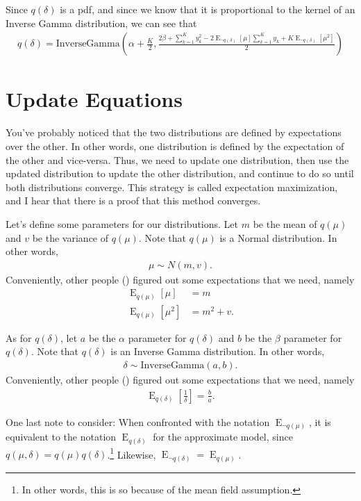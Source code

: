 \documentclass[12pt]{article}
\newcommand{\E}{\operatorname{E}}
\begin{document}
Since $q(\delta)$ is a pdf, and since we know that it is proportional to the
kernel of an Inverse Gamma distribution, we can see that
\begin{align}\label{eq:qdelta}
    q(\delta) = \text{InverseGamma}\left(\alpha + \frac{K}{2},
    \frac{2\beta + \sum_{k=1}^{K} y_{k}^{2} - 2 \E_{\neg q(\delta)}[\mu]
    \sum_{k=1}^{K} y_{k} + K\E_{\neg q(\delta)}[\mu^2]}{2}
    \right)
\end{align}

\section{Update Equations}

You've probably noticed that the two distributions are defined by expectations
over the other.  In other words, one distribution is defined by the expectation
of the other and vice-versa.  Thus, we need to update one distribution, then use
the updated distribution to update the other distribution, and continue to do so
until both distributions converge.  This strategy is called expectation
maximization, and I hear that there is a proof that this method converges.

Let's define some parameters for our distributions.  Let $m$ be the mean of
$q(\mu)$ and $v$ be the variance of $q(\mu)$.  Note that $q(\mu)$ is a Normal
distribution.  In other words,
\begin{align}
    \mu \sim N(m, v).
\end{align}
Conveniently, other people (\autocite{gaussian}) figured out some
expectations that we need, namely
\begin{align}
    \E_{q(\mu)}[\mu] &= m \\
    \E_{q(\mu)}[\mu^2] &= m^2 + v.
\end{align}

As for $q(\delta)$, let $a$ be the $\alpha$ parameter for $q(\delta)$ and $b$ be
the $\beta$ parameter for $q(\delta)$.  Note that $q(\delta)$ is an Inverse
Gamma distribution.  In other words,
\begin{align}
    \delta \sim \text{InverseGamma}(a, b).
\end{align}
Conveniently, other people (\autocite{invgamma}) figured out
some expectations that we need, namely
\begin{align}
    \E_{q(\delta)}[\frac{1}{\delta}] = \frac{b}{a}.
\end{align}

One last note to consider:  When confronted with the notation $\E_{\neg
q(\mu)}$, it is equivalent to the notation $\E_{q(\delta)}$ for the approximate
model, since $q(\mu, \delta) = q(\mu)q(\delta)$.\footnote{In other words, this
is so because of the mean field assumption.}  Likewise, $\E_{\neg q(\delta)} =
\E_{q(\mu)}$.
\end{document}
